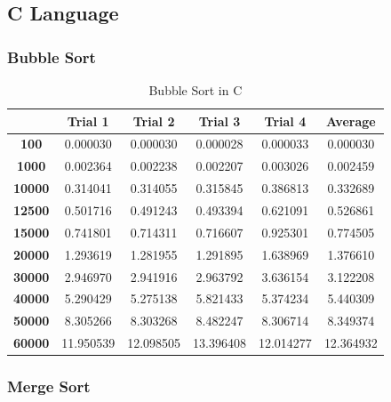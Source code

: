 \documentclass[]{report}
\begin{document}
			\subsection{C Language}
		 		\subsubsection{Bubble Sort}
		 		
		 		\begin{table}[H]  
  				  \centering
  				  \caption{Bubble Sort in C}
		 		  \begin{tabular}{cccccc}
		 		    \toprule
		 		         & \textbf{Trial 1} & \textbf{Trial 2} & \textbf{Trial 3} & \textbf{Trial 4} & \textbf{Average} \\ \midrule
		 		    \textbf{100}   & 0.000030 & 0.000030 & 0.000028 & 0.000033 & 0.000030   \\
		 		    \textbf{1000}  & 0.002364 & 0.002238 & 0.002207 & 0.003026 & 0.002459   \\
		 		    \textbf{10000} & 0.314041 & 0.314055 & 0.315845 & 0.386813 & 0.332689   \\
		 		    \textbf{12500} & 0.501716 & 0.491243 & 0.493394 & 0.621091 & 0.526861   \\
		 		    \textbf{15000} & 0.741801 & 0.714311 & 0.716607 & 0.925301 & 0.774505   \\
		 		    \textbf{20000} & 1.293619 & 1.281955 & 1.291895 & 1.638969 & 1.376610   \\
		 		    \textbf{30000} & 2.946970 & 2.941916 & 2.963792 & 3.636154 & 3.122208   \\
		 		    \textbf{40000} & 5.290429 & 5.275138 & 5.821433 & 5.374234 & 5.440309   \\
		 		    \textbf{50000} & 8.305266 & 8.303268 & 8.482247 & 8.306714 & 8.349374   \\
		 		    \textbf{60000} & 11.950539 & 12.098505 & 13.396408 & 12.014277 & 12.364932   \\ \bottomrule
		 		  \end{tabular}
		 		\end{table}

		 		\subsubsection{Merge Sort} 
		 		
\end{document}
